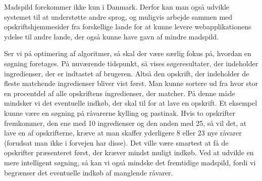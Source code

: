 Madspild forekommer ikke kun i Danmark. Derfor kan man også udvikle systemet til at understøtte andre sprog, og muligvis arbejde sammen med opskriftshjemmesider fra forskellige lande for at kunne levere webapplikationens ydelse til andre lande, der også kunne have gavn af mindre madspild.

Ser vi på optimering af algoritmer, så skal der være særlig fokus på, hvordan en søgning foretages. På nuværende tidspunkt, så vises søgeresultater, der indeholder ingredienser, der er indtastet af brugeren. Altså den opskrift, der indeholder de fleste matchende ingredienser bliver vist først. Man kunne \fx sortere ud fra hvor stor en procentdel af alle opskriftens ingredienser, der matcher. På denne måde mindsker vi det eventuelle indkøb, der skal til for at lave en opskrift. 
Et eksempel kunne være en søgning på råvarerne kylling og pastinak. Hvis to opskrifter fremkommer, den ene med 10 ingredienser og den anden med 25, så vil det, at lave en af opskrifterne, kræve at man skaffer yderligere 8 eller 23 nye råvarer (forudsat man ikke i forvejen har disse). Det ville være smartest at få de opskrifter præsenteret først, der kræver mindst muligt indkøb. Ved at udvikle en mere intelligent søgning, så kan vi også mindske det fremtidige madspild, fordi vi begrænser det eventuelle indkøb af manglende råvarer.
